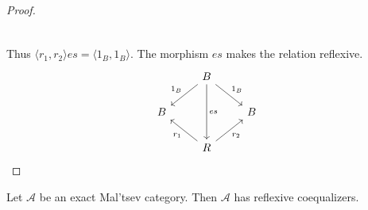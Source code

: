 \begin{subbox}{}
\begin{proof}
\[\begin{tikzcd}
  \end{tikzcd}
\]
Thus $\langle r_1,r_2\rangle es = \langle 1_B,1_B \rangle$. The morphism $es$ makes the relation reflexive.
\[
\begin{tikzcd}
    & B \arrow[dd, "es"] \arrow[ld, "1_B"'] \arrow[rd, "1_B"] &   \\
  B &                                                         & B \\
    & R \arrow[lu, "r_1"] \arrow[ru, "r_2"']                  &  
  \end{tikzcd}
\]
    \end{proof}
\end{subbox}

\begin{mainbox}{}
    \begin{prop}\label{exact and Maltsev cat has reflexive coeq}
        Let $\mathcal{A}$ be an exact Mal'tsev category. Then $\mathcal{A}$ has reflexive coequalizers.
    \end{prop}
\end{mainbox}

